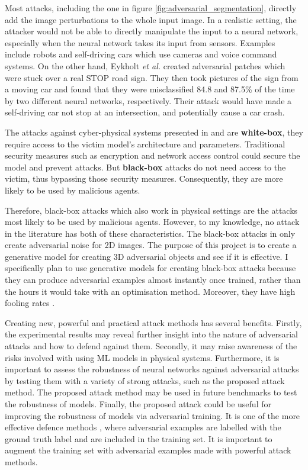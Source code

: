 Most attacks, including the one in figure \ref{fig:adversarial_segmentation}, directly add the image perturbations to the whole input image. In a realistic setting, the attacker would not be able to directly manipulate the input to a neural network, especially when the neural network takes its input from sensors. Examples include robots and self-driving cars which use cameras and voice command systems. On the other hand, Eykholt \textit{et al.} \cite{evtimov_road_signs} created adversarial patches which were stuck over a real STOP road sign. They then took pictures of the sign from a moving car and found that they were misclassified 84.8 and 87.5\% of the time by two different neural networks, respectively. Their attack would have made a self-driving car not stop at an intersection, and potentially cause a car crash.

The attacks against cyber-physical systems presented in \cite{athalye} and \cite{evtimov_road_signs} are \textbf{white-box}, they require access to the victim model's architecture and parameters. Traditional security measures such as encryption and network access control could secure the model and prevent attacks. But \textbf{black-box} attacks do not need access to the victim, thus bypassing those security measures. Consequently, they are more likely to be used by malicious agents. 

Therefore, black-box attacks which also work in physical settings are the attacks most likely to be used by malicious agents. However, to my knowledge, no attack in the literature has both of these characteristics. The black-box attacks in \cite{upset_angri, zheng_black_box_GAN, advGAN} only create adversarial noise for 2D images. The purpose of this project is to create a generative model for creating 3D adversarial objects \cite{athalye} and see if it is effective.  I specifically plan to use generative models for creating black-box attacks because they can produce adversarial examples almost instantly \cite{advGAN} once trained, rather than the hours it would take with an optimisation method. Moreover, they have high fooling rates \cite{upset_angri, zheng_black_box_GAN, advGAN}.

Creating new, powerful and practical attack methods has several benefits. Firstly, the experimental results may reveal further insight into the nature of adversarial attacks and how to defend against them. Secondly, it may raise awareness of the risks involved with using ML models in physical systems. Furthermore, it is important to assess the robustness of neural networks against adversarial attacks by testing them with a variety of strong attacks, such as the proposed attack method. The proposed attack method may be used in future benchmarks to test the robustness of models. Finally, the proposed attack could be useful for improving the robustness of models via adversarial training. It is one of the more effective defence methods \cite{dong2020benchmarking}, where adversarial examples are labelled with the ground truth label and are included in the training set. It is important to augment the training set with adversarial examples made with powerful attack methods.

